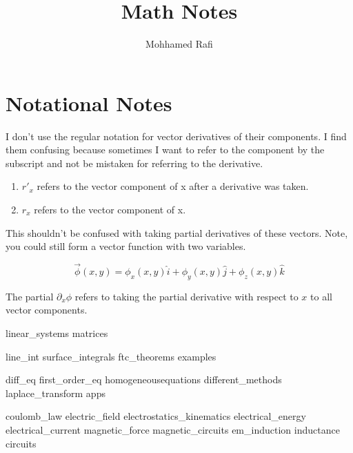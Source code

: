 \documentclass[oneside]{mathnotes}
\title{Math Notes}
\author{Mohhamed Rafi}
\begin{document}
	\maketitle
	\tableofcontents\thispagestyle{fancy}
	\pagebreak

	\section*{Notational Notes}
	I don't use the regular notation for vector derivatives of their components. I find them confusing because sometimes I want to refer to the component by the subscript and not be mistaken for referring to the derivative.

	\begin{enumerate}
	\item $r'_x$ refers to the vector component of x after a derivative was taken.
	\item $r_x$ refers to the vector component of x.
	\end{enumerate}
	This shouldn't be confused with taking partial derivatives of these vectors. Note, you could still form a vector function with two variables. 

	\begin{equation*}
		\vec{\phi}(x,y) = \phi_x(x,y)\hat{i} + \phi_y(x,y)\hat{j} + \phi_z(x,y)\hat{k}
	\end{equation*}

	The partial $\partial_x\phi$ refers to taking the partial derivative with respect to $x$ to all vector components.


	{linear_systems}
	{matrices}


	{line_int}
	{surface_integrals}
	{ftc_theorems}
	{examples}
	
	{diff_eq}
	{first_order_eq}
	{homogeneousequations}
	{different_methods}
	{laplace_transform}
	{apps}
	
	{coulomb_law}
	{electric_field}
	{electrostatics_kinematics}
	{electrical_energy}
	{electrical_current}
	{magnetic_force}
	{magnetic_circuits}
	{em_induction}
	{inductance}
	{circuits}
\end{document}
